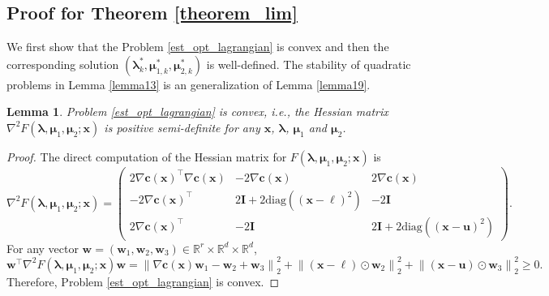 \documentclass[aos]{imsart}
\numberwithin{equation}{section}
\theoremstyle{plain}
\newtheorem{lemma}{Lemma}
\begin{document}
\begin{appendix}
    \subsection{Proof for Theorem \ref{theorem_lim}}
We first show that the Problem \eqref{est_opt_lagrangian} is convex and then the corresponding solution $(\bm{\lambda}_{k}^{*}, \bm{\mu}_{1,k}^{*}, \bm{\mu}_{2,k}^{*})$ is well-defined. The stability of quadratic problems in Lemma \ref{lemma13} is an generalization of Lemma \ref{lemma19}.
    \begin{lemma}
    Problem \eqref{est_opt_lagrangian} is convex, i.e., the Hessian matrix $\nabla^2 F(\bm{\lambda}, \bm{\mu}_{1}, \bm{\mu}_2; \bm{x})$ is positive semi-definite for any $\bm{x}$, $\bm{\lambda}$, $\bm{\mu}_{1}$ and $\bm{\mu}_2$. 
\end{lemma}


\begin{proof}
    The direct computation of the Hessian matrix for $F(\bm{\lambda}, \bm{\mu}_{1}, \bm{\mu}_2; \bm{x})$ is
    \begin{equation}
        \nabla^2 F(\bm{\lambda}, \bm{\mu}_{1}, \bm{\mu}_2; \bm{x}) = \left( \begin{array}{ccc}
            2 \nabla \bm{c}(\bm{x})^{\top} \nabla \bm{c}(\bm{x})  & -2 \nabla \bm{c}(\bm{x}) & 2 \nabla \bm{c}(\bm{x}) \\
            -2 \nabla \bm{c}(\bm{x})^{\top} & 2 \bm{I} + 2 \text{diag}\left( \left( \bm{x} - \bm{\ell} \right)^2 \right) & -2 \bm{I} \\
            2 \nabla \bm{c}(\bm{x})^{\top} & -2 \bm{I} & 2 \bm{I} + 2 \text{diag}\left( \left( \bm{x} - \bm{u} \right)^2 \right) 
        \end{array} \right).
    \end{equation}
    For any vector $\bm{w} = (\bm{w}_1, \bm{w}_2, \bm{w}_3) \in \mathbb{R}^{r} \times \mathbb{R}^{d} \times \mathbb{R}^{d}$,
    \begin{equation*}
        \bm{w}^{\top} \nabla^2 F(\bm{\lambda}, \bm{\mu}_{1}, \bm{\mu}_2; \bm{x}) \bm{w} = \left\| \nabla \bm{c}(\bm{x}) \bm{w}_1 - \bm{w}_2 + \bm{w}_3 \right\|_2^2 + \left\| \left( \bm{x} - \bm{\ell} \right) \odot \bm{w}_2 \right\|_2^2 + \left\| \left( \bm{x} - \bm{u} \right) \odot \bm{w}_3 \right\|_2^2 \geq 0.
    \end{equation*}
    Therefore, Problem \eqref{est_opt_lagrangian} is convex.
\end{proof}



\end{appendix}
\end{document}
